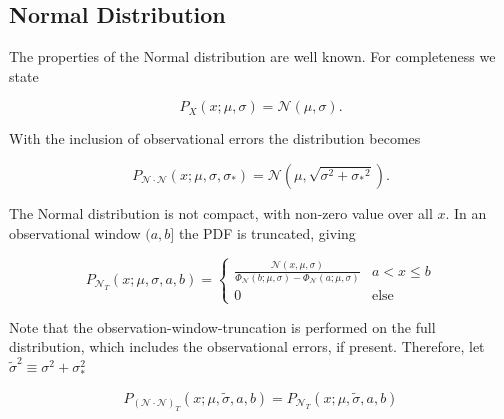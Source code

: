\documentclass[twocolumn]{aastex631}
\newcommand{\mcal}[1]{\mathcal{#1}}
\newcommand{\sigobs}{{\sigma_*}}
\begin{document}
    \subsection{Normal Distribution} \label{app:sub:normal_distribution}

        The properties of the Normal distribution are well known. For
        completeness we state

        \begin{equation}
            P_X(x; \mu, \sigma) = \mcal{N}(\mu, \sigma).
        \end{equation}

        With the inclusion of observational errors the distribution becomes

        \begin{equation}
            P_{\mcal{N}\cdot\mcal{N}}(x; \mu, \sigma, \sigobs) = \mcal{N}(\mu, \sqrt{\sigma^2 + \sigobs^2}).
        \end{equation}

        The Normal distribution is not compact, with non-zero value over all
        $x$. In an observational window $(a,b]$ the PDF is truncated, giving

        \begin{equation}
            P_{\mcal{N}_T}(x; \mu, \sigma, a, b) = \begin{cases}
                \frac{\mcal{N}(x, \mu, \sigma)}{\Phi_\mcal{N}(b; \mu, \sigma) - \Phi_\mcal{N}(a; \mu, \sigma)} & a < x \leq b \\
                0 & \text{else}
            \end{cases}
        \end{equation}

        Note that the observation-window-truncation is performed on the full
        distribution, which includes the observational errors, if present.
        Therefore, let $\tilde{\sigma}^2 \equiv \sigma^2+\sigma_*^2$

        \begin{equation}
            P_{(\mcal{N}\cdot\mcal{N})_T}(x; \mu, \tilde{\sigma}, a, b) = P_{\mcal{N}_T}(x; \mu, \tilde{\sigma}, a, b)
        \end{equation}
\end{document}
